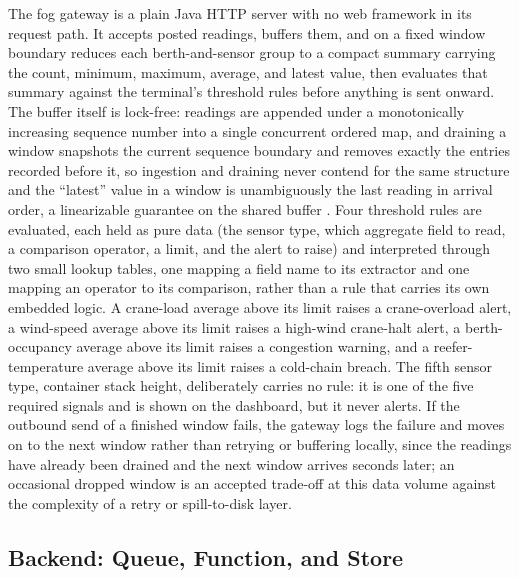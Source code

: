\documentclass[conference]{IEEEtran}
\begin{document}
The fog gateway is a plain Java HTTP server with no web framework in its request path. It accepts posted readings, buffers them, and on a fixed window boundary reduces each berth-and-sensor group to a compact summary carrying the count, minimum, maximum, average, and latest value, then evaluates that summary against the terminal's threshold rules before anything is sent onward. The buffer itself is lock-free: readings are appended under a monotonically increasing sequence number into a single concurrent ordered map, and draining a window snapshots the current sequence boundary and removes exactly the entries recorded before it, so ingestion and draining never contend for the same structure and the ``latest'' value in a window is unambiguously the last reading in arrival order, a linearizable guarantee on the shared buffer \cite{ref14}. Four threshold rules are evaluated, each held as pure data (the sensor type, which aggregate field to read, a comparison operator, a limit, and the alert to raise) and interpreted through two small lookup tables, one mapping a field name to its extractor and one mapping an operator to its comparison, rather than a rule that carries its own embedded logic. A crane-load average above its limit raises a crane-overload alert, a wind-speed average above its limit raises a high-wind crane-halt alert, a berth-occupancy average above its limit raises a congestion warning, and a reefer-temperature average above its limit raises a cold-chain breach. The fifth sensor type, container stack height, deliberately carries no rule: it is one of the five required signals and is shown on the dashboard, but it never alerts. If the outbound send of a finished window fails, the gateway logs the failure and moves on to the next window rather than retrying or buffering locally, since the readings have already been drained and the next window arrives seconds later; an occasional dropped window is an accepted trade-off at this data volume against the complexity of a retry or spill-to-disk layer.

\subsection{Backend: Queue, Function, and Store}
\end{document}
